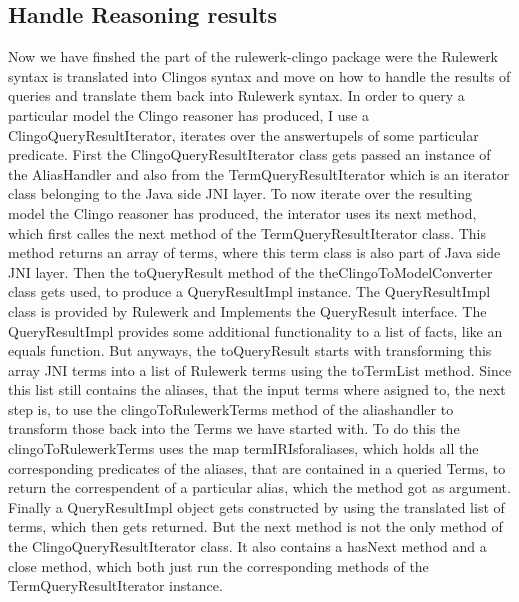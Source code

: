 \documentclass[hyperref, bachelorofscience]{cgvpub}
\begin{document}
\subsection{Handle Reasoning results}
Now we have finshed the part of the rulewerk-clingo package were the Rulewerk syntax is translated into Clingos syntax and move on how to handle the results of queries and translate them back into Rulewerk syntax. In order to query a particular model the Clingo reasoner has produced, I use a ClingoQueryResultIterator, iterates over the answertupels of some particular predicate. First the ClingoQueryResultIterator class gets passed an instance of the AliasHandler and also from the TermQueryResultIterator which is an iterator class belonging to the Java side JNI layer. To now iterate over the resulting model the Clingo reasoner has produced, the interator uses its next method, which first calles the next method of the TermQueryResultIterator class. This method returns an array of terms, where this term class is also part of Java side JNI layer. Then the toQueryResult method of the theClingoToModelConverter class gets used, to produce a QueryResultImpl instance. The QueryResultImpl class is provided by Rulewerk and Implements the QueryResult interface. The QueryResultImpl provides some additional functionality to a list of facts, like an equals function. But anyways, the toQueryResult starts with transforming this array JNI terms into a list of Rulewerk terms using the toTermList method. Since this list still contains the aliases, that the input terms where asigned to, the next step is, to use the clingoToRulewerkTerms method of the aliashandler to transform those back into the Terms we have started with. To do this the clingoToRulewerkTerms uses the map termIRIsforaliases, which holds all the corresponding predicates of the aliases, that are contained in a queried Terms, to return the correspendent of a particular alias, which the method got as argument. Finally a QueryResultImpl object gets constructed by using the translated list of terms, which then gets returned. But the next method is not the only method of the ClingoQueryResultIterator class. It also contains a hasNext method and a close method, which both just run the corresponding methods of the TermQueryResultIterator instance.\\ 
\end{document}
